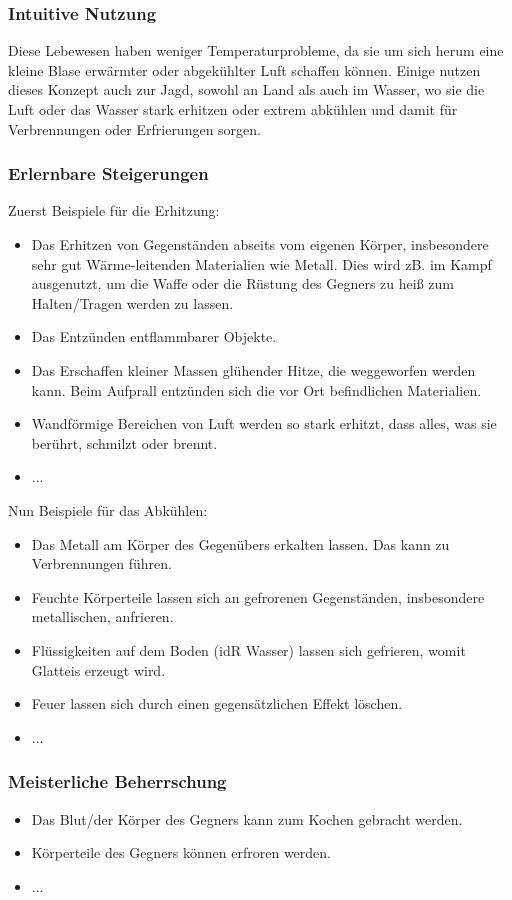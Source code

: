 \subsubsection{Intuitive Nutzung}
Diese Lebewesen haben weniger Temperaturprobleme, da sie um sich herum eine kleine Blase erwärmter oder abgekühlter Luft schaffen können. Einige nutzen dieses Konzept auch zur Jagd, sowohl an Land als auch im Wasser, wo sie die Luft oder das Wasser stark erhitzen oder extrem abkühlen und damit für Verbrennungen oder Erfrierungen sorgen.

\subsubsection{Erlernbare Steigerungen}
Zuerst Beispiele für die Erhitzung:
\begin{itemize}
	\item Das Erhitzen von Gegenständen abseits vom eigenen Körper, insbesondere sehr gut Wärme-leitenden Materialien wie Metall. Dies wird zB. im Kampf ausgenutzt, um die Waffe oder die Rüstung des Gegners zu heiß zum Halten/Tragen werden zu lassen.
	\item Das Entzünden entflammbarer Objekte.
	\item Das Erschaffen kleiner Massen glühender Hitze, die weggeworfen werden kann. Beim Aufprall entzünden sich die vor Ort befindlichen Materialien. 
	\item Wandförmige Bereichen von Luft werden so stark erhitzt, dass alles, was sie berührt, schmilzt oder brennt.
	\item ...
\end{itemize}

Nun Beispiele für das Abkühlen:
\begin{itemize}
	\item Das Metall am Körper des Gegenübers erkalten lassen. Das kann zu Verbrennungen führen.
	\item Feuchte Körperteile lassen sich an gefrorenen Gegenständen, insbesondere metallischen, anfrieren.
	\item Flüssigkeiten auf dem Boden (idR Wasser) lassen sich gefrieren, womit Glatteis erzeugt wird.
	\item Feuer lassen sich durch einen gegensätzlichen Effekt löschen.
	\item ...
\end{itemize}

\subsubsection{Meisterliche Beherrschung} 
\begin{itemize}
	\item Das Blut/der Körper des Gegners kann zum Kochen gebracht werden.
	\item Körperteile des Gegners können erfroren werden.
	\item ...
\end{itemize}



